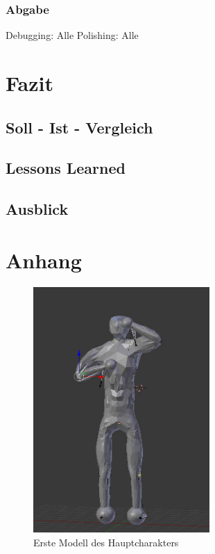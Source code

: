 \documentclass[12pt]{article}
\begin{document}
\vspace{1cm}
\subsubsection{Abgabe}

Debugging: Alle\newline
Polishing: Alle\newline

\newpage
\section{Fazit}

\vspace{2cm}
\subsection{Soll - Ist - Vergleich}

\vspace{2cm}
\subsection{Lessons Learned}

\vspace{2cm}
\subsection{Ausblick}

\section{Anhang}

\begin{figure}
	\centering
	\includegraphics[width=0.6\textwidth]{lowPoly}
	\caption{Erste Modell des Hauptcharakters
		\label{fig:lowpoly}}
\end{figure}
\end{document}
